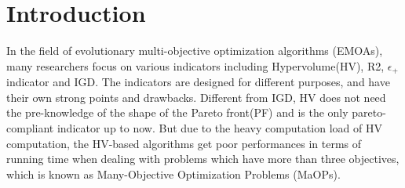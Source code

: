\documentclass[conference]{IEEEtran}
\begin{document}
%
\IEEEpeerreviewmaketitle

% 
\section{Introduction}
In the field of evolutionary multi-objective optimization algorithms (EMOAs), 
many researchers focus on various indicators including Hypervolume(HV)\cite{hypervolume}, R2\cite{R2}, $\epsilon_+$ indicator\cite{e+} and IGD\cite{IGD}.
The indicators are designed for different purposes, and 
have their own strong points and drawbacks. Different from IGD, 
HV does not need the pre-knowledge of the shape of the Pareto front(PF) 
and is the only pareto-compliant indicator up to now\cite{pareto_compliant}. 
But due to the heavy computation load of HV computation\cite{hypervolume:computationLoad}, 
the HV-based algorithms get poor performances in terms of running time when dealing with problems which have more than three objectives, 
which is known as Many-Objective Optimization Problems (MaOPs). 
\end{document}
